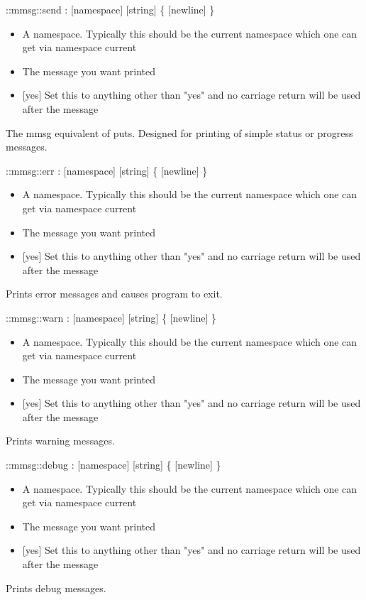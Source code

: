 \begin{code}     
  ::mmsg::send : [namespace] [string] \{ [newline] \}
\end{code}
\begin{itemize}
\item {} A namespace. Typically this should be the
  current namespace which one can get via namespace current
\item {} The message you want printed
\item {} [yes] Set this to anything other than "yes" and no
  carriage return will be used after the message
\end{itemize}
The mmsg equivalent of puts. Designed for printing of simple status or
progress messages.
\begin{code} 
  ::mmsg::err : [namespace] [string] \{ [newline] \}
\end{code}
\begin{itemize}
\item {} A namespace. Typically this should be the
  current namespace which one can get via namespace current
\item {} The message you want printed
\item {} [yes] Set this to anything other than "yes" and no
  carriage return will be used after the message
\end{itemize}
Prints error messages and causes program to exit.
\begin{code} 
  ::mmsg::warn : [namespace] [string] \{ [newline] \}
\end{code}
\begin{itemize}
\item {} A namespace. Typically this should be the
  current namespace which one can get via namespace current
\item {} The message you want printed
\item {} [yes] Set this to anything other than "yes" and no
  carriage return will be used after the message
\end{itemize}
Prints warning messages.
\begin{code} 
  ::mmsg::debug : [namespace] [string] \{ [newline] \}
\end{code}
\begin{itemize}
\item {} A namespace. Typically this should be the
  current namespace which one can get via namespace current
\item {} The message you want printed
\item {} [yes] Set this to anything other than "yes" and no
  carriage return will be used after the message
\end{itemize}
Prints debug messages.

